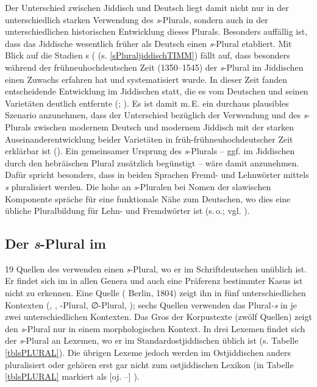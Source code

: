  Der Unterschied zwischen Jiddisch und Deutsch liegt damit nicht nur in der unterschiedlich starken Verwendung des \textit{s}-Plurals, sondern auch in der unterschiedlichen historischen Entwicklung dieses Plurals. Besonders auffällig ist, dass das Jiddische wesentlich früher als Deutsch einen \textit{s}-Plural etabliert. Mit Blick auf die Stadien \citeauthor{Timm2007}s (\citeyear{Timm2007} (s. \ref{sPluraljiddischTIMM}) fällt auf, dass besonders während der frühneuhochdeutschen Zeit (1350–1545) der \textit{s}-Plural im Jiddischen einen Zuwachs erfahren hat und systematisiert wurde. In dieser Zeit fanden entscheidende Entwicklung im Jiddischen statt, die es vom Deutschen und seinen Varietäten deutlich entfernte (\cite{Timm2005}; \cite{Santorini1992, Santorini1993b, Santorini1993a}). Es ist damit m.\,E. ein durchaus plausibles Szenario anzunehmen, dass der Unterschied bezüglich der Verwendung und  des \textit{s}-Plurals zwischen modernem Deutsch und modernem Jiddisch mit der starken Auseinanderentwicklung beider Varietäten in früh-frühneuhochdeutscher Zeit erklärbar ist (\cite{Timm2005}). Ein gemeinsamer Ursprung des \textit{s}-Plurals – ggf. im Jiddischen durch den hebräischen Plural zusätzlich begünstigt – wäre damit anzunehmen. Dafür spricht besonders, dass in beiden Sprachen Fremd- und Lehnwörter mittels \textit{s} pluralisiert werden. Die hohe  an \textit{s}-Pluralen bei Nomen der slawischen Komponente spräche für eine funktionale Nähe zum Deutschen, wo dies eine übliche Pluralbildung für Lehn- und Fremdwörter ist (s.\,o.; vgl. \cite{Wegener2004}).\\
 
 
 
  \subsection{Der \textit{s}-Plural im }\label{sPluralLiJi}
  19 Quellen des  verwenden einen \textit{s}-Plural, wo er im Schriftdeutschen unüblich ist. Er findet sich im  in allen Genera und auch eine Präferenz bestimmter Kasus ist nicht zu erkennen. Eine Quelle ( Berlin, 1804) zeigt ihn in fünf unterschiedlichen Kontexten (, , \textschwa-Plural, ∅-Plural, ); sechs Quellen verwenden das Plural\textit{-s} in je zwei unterschiedlichen Kontexten. Das Gros der Korpustexte (zwölf Quellen) zeigt den \textit{s}-Plural nur in einem morphologischen Kontext. In drei Lexemen findet sich der \textit{s}-Plural an Lexemen, wo er im Standardostjiddischen üblich ist  (s. Tabelle \ref{tblsPLURAL}). Die übrigen Lexeme jedoch werden im Ostjiddischen anders pluralisiert oder gehören erst gar nicht zum ostjiddischen Lexikon (in Tabelle  \ref{tblsPLURAL} markiert als [oj. –] ). 
  
